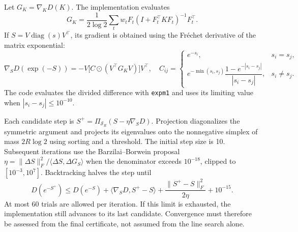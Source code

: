 Let $G_K=\nabla_KD(K)$. The implementation evaluates
\[
 G_K=\frac{1}{2\log2}\sum_t w_t
 F_t(I+F_t^\top K F_t)^{-1}F_t^\top.
\]
If $S=V\operatorname{diag}(s)V^\top$, its gradient is obtained using the
Fr\'echet derivative of the matrix exponential:
\[
 \nabla_SD(\exp(-S))=-V\bigl[C\odot(V^\top G_KV)\bigr]V^\top,
 \quad
 C_{ij}=\begin{cases}
 e^{-s_i},&s_i=s_j,\\
 e^{-\min(s_i,s_j)}\dfrac{1-e^{-|s_i-s_j|}}{|s_i-s_j|},&s_i\ne s_j.
 \end{cases}
\]
The code evaluates the divided difference with \texttt{expm1} and uses its
limiting value when $|s_i-s_j|\le10^{-10}$.

Each candidate step is
$S^+=\Pi_{\mathcal S_R}(S-\eta\nabla_SD)$.
Projection diagonalizes the symmetric argument and projects its eigenvalues
onto the nonnegative simplex of mass $2R\log2$ using sorting and a threshold.
The initial step size is 10. Subsequent iterations use the
Barzilai--Borwein proposal
$\eta=\|\Delta S\|_F^2/\langle\Delta S,\Delta G_S\rangle$
when the denominator exceeds $10^{-18}$, clipped to $[10^{-3},10^7]$.
Backtracking halves the step until
\[
 D(e^{-S^+})\le D(e^{-S})+
 \langle\nabla_SD,S^+-S\rangle+
 \frac{\|S^+-S\|_F^2}{2\eta}+10^{-15}.
\]
At most 60 trials are allowed per iteration. If this limit is exhausted,
the implementation still advances to its last candidate. Convergence must
therefore be assessed from the final certificate, not assumed from the line
search alone.

